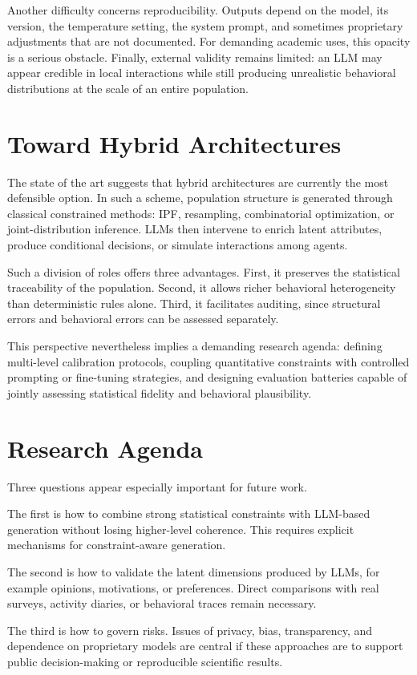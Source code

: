 \documentclass[11pt,a4paper]{article}
\begin{document}
Another difficulty concerns reproducibility. Outputs depend on the model, its version, the temperature setting, the system prompt, and sometimes proprietary adjustments that are not documented. For demanding academic uses, this opacity is a serious obstacle. Finally, external validity remains limited: an LLM may appear credible in local interactions while still producing unrealistic behavioral distributions at the scale of an entire population.

\section{Toward Hybrid Architectures}
The state of the art suggests that hybrid architectures are currently the most defensible option. In such a scheme, population structure is generated through classical constrained methods: IPF, resampling, combinatorial optimization, or joint-distribution inference. LLMs then intervene to enrich latent attributes, produce conditional decisions, or simulate interactions among agents.

Such a division of roles offers three advantages. First, it preserves the statistical traceability of the population. Second, it allows richer behavioral heterogeneity than deterministic rules alone. Third, it facilitates auditing, since structural errors and behavioral errors can be assessed separately.

This perspective nevertheless implies a demanding research agenda: defining multi-level calibration protocols, coupling quantitative constraints with controlled prompting or fine-tuning strategies, and designing evaluation batteries capable of jointly assessing statistical fidelity and behavioral plausibility.

\section{Research Agenda}
Three questions appear especially important for future work.

The first is how to combine strong statistical constraints with LLM-based generation without losing higher-level coherence. This requires explicit mechanisms for constraint-aware generation.

The second is how to validate the latent dimensions produced by LLMs, for example opinions, motivations, or preferences. Direct comparisons with real surveys, activity diaries, or behavioral traces remain necessary.

The third is how to govern risks. Issues of privacy, bias, transparency, and dependence on proprietary models are central if these approaches are to support public decision-making or reproducible scientific results.
\end{document}
